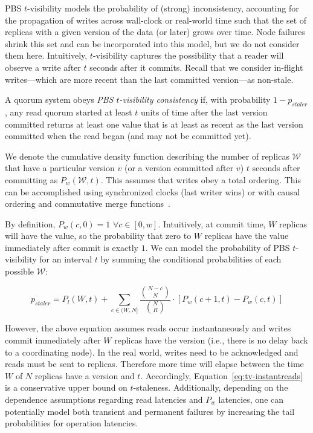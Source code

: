 \documentclass{vldb}
\begin{document}
PBS $t$-visibility models the probability of (strong) inconsistency,
accounting for the propagation of writes across wall-clock or
real-world time such that the set of replicas with a given version of
the data (or later) grows over time.  Node failures shrink this set
and can be incorporated into this model, but we do not consider them
here.  Intuitively, $t$-visibility captures the possibility that a
reader will observe a write after $t$ seconds after it commits.
Recall that we consider in-flight writes---which are more recent than
the last committed version---as non-stale.

\begin{definition}
A quorum system obeys \textit{PBS $t$-visibility consistency} if, with
probability $1-p_{staler}$, any read quorum started at least $t$ units
of time after the last version committed returns at least one value
that is at least as recent as the last version committed when the read
began (and may not be committed yet).
\end{definition}

We denote the cumulative density function describing the number
of replicas $\mathcal{W}$ that have a particular version $v$ (or a
version committed after $v$) $t$ seconds after committing as
$P_w(\mathcal{W}, t)$.  This assumes that writes obey a total
ordering. This can be accomplished using synchronized clocks (last
writer wins) or with causal ordering and commutative merge
functions~\cite{cops}.

By definition, $P_w(c,0) = 1$ $\forall c \in [0, w]$.  Intuitively, at
commit time, $W$ replicas will have the value, so the probability that
zero to $W$ replicas have the value immediately after commit is
exactly $1$.  We can model the probability of PBS $t$-visibility for
an interval $t$ by summing the conditional probabilities of each
possible $\mathcal{W}$:

\begin{equation}
\label{eq:tv-instantreads}
p_{staler} = P_l(W, t)+\sum_{c\in(W, N]} \frac{{N-c \choose N}}{{N \choose R}}\cdot [P_w(c+1, t)-P_w(c,t)]
\end{equation}

However, the above equation assumes reads occur instantaneously and
writes commit immediately after $W$ replicas have the version (i.e.,
there is no delay back to a coordinating node).  In the real world,
writes need to be acknowledged and reads must be sent to replicas.
Therefore more time will elapse between the time $W$ of $N$ replicas
have a version and $t$.  Accordingly,
Equation~\ref{eq:tv-instantreads} is a conservative upper bound on
$t$-staleness.  Additionally, depending on the dependence assumptions
regarding read latencies and $P_w$ latencies, one can potentially
model both transient and permanent failures by increasing the tail
probabilities for operation latencies.
\end{document}

